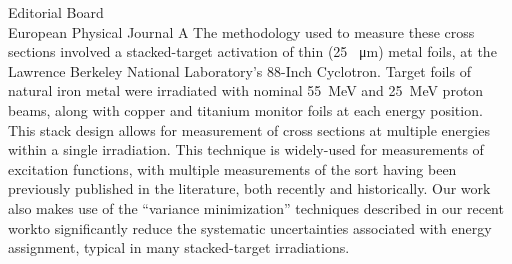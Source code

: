 \documentclass{letter} %
\begin{document}
\begin{letter}{
Editorial Board \\
European Physical Journal A}
\noindent The methodology used to measure these cross sections involved a stacked-target activation of thin (25 \SI{}{\micro\meter}) metal foils,  at the Lawrence Berkeley National Laboratory's 88-Inch Cyclotron. Target foils of natural iron metal were irradiated with nominal 55~MeV and 25~MeV proton beams, along with copper and titanium monitor foils at each energy position.   This stack design allows for measurement of cross sections at multiple energies within a single irradiation. This technique is widely-used for measurements of excitation functions, with multiple measurements of the sort having been previously published in the literature, both recently and historically\footnotemark[5]\footnotemark[6]\footnotemark[7]\footnotemark[8]. 
Our work also makes use of the ``variance minimization'' techniques described in our recent work\footnotemark[10] to significantly reduce the systematic uncertainties associated with energy assignment, typical in many stacked-target irradiations.





\end{letter}
\end{document}
